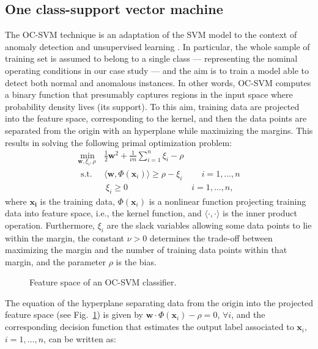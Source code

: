\subsection{One class-support vector machine}
The OC-SVM technique is an adaptation of the SVM model to the context of anomaly detection and unsupervised learning \cite{scholkopf2001estimating}. In particular, the whole sample of training set is assumed to belong to a single class --- representing the nominal operating conditions in our case study --- and the aim is to train a model able to detect both normal and anomalous instances. In other words, OC-SVM computes a binary function that presumably captures regions in the input space where probability density lives (its support). To this aim, training data are projected into the feature space, corresponding to the kernel, and then the data points are separated from the origin with an hyperplane while maximizing the margins. This results in solving the following primal optimization problem:
\begin{equation}\label{eqn:primalProb}
\begin{split}
\min_{\mathbf{w}, \xi_{i}, \rho~} &\frac{1}{2}{\mathbf{w}} ^{2}+\frac{1}{\nu n} \sum_{i=1}^{n} \xi_{i}-\rho \\
\text { s.t. } &\langle \mathbf{w}, \Phi(\mathbf{x}_{i})\rangle \geq \rho-\xi_{i} \quad\quad ~i=1, \ldots, n \\
&~\xi_{i} \geq 0 \quad \quad \quad \quad \quad \quad \quad ~~i=1, \ldots, n,
\end{split}
\end{equation}
where $\mathbf{x_i}$ is the training data, $\Phi(\mathbf{x}_i)$ is a nonlinear function projecting training data into feature space, i.e., the kernel function, and $\langle \cdot, \cdot \rangle$ is the inner product operation. Furthermore, $\xi_i$ are the slack variables allowing some data points to lie within the margin, the constant $\nu>0$ determines the trade-off between maximizing the margin and the number of training data points within that margin, and the parameter $\rho$ is the bias.

\begin{figure}
    \centering
	\vspace{0.1cm}
	
	\caption{Feature space of an OC-SVM classifier.}
    \label{fig:oc-svmfig}
\end{figure}

The equation of the hyperplane separating data from the origin into the projected feature space (see Fig.~\ref{fig:oc-svmfig}) is given by $\mathbf{w} \cdot\Phi(\mathbf{x}_i )-\rho=0$, $\forall i$, and the corresponding decision function that estimates the output label associated to $\mathbf{x}_i$, $i = 1, \dots, n$, can be written as:

